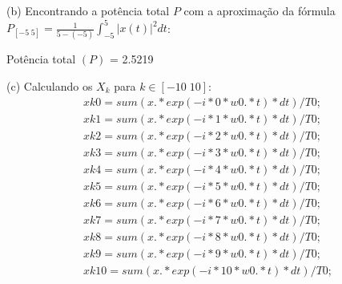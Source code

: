 \documentclass{article}
\begin{document}
\vspace{\baselineskip}

(b) Encontrando a potência total $P$ com a aproximação da fórmula $P_{[-5\;5]} = \frac{1}{5 - (-5)} \int_{-5}^{5} |x(t)|^2 dt $:

\vspace{\baselineskip}

Potência total $(P)$ = 2.5219

\vspace{\baselineskip}

(c) Calculando os $X_{k}$ para $k \in [-10\;10]$:
\begin{align*}
    xk0 = sum(x.*exp(-i*0*w0.*t)*dt)/T0;\\
    xk1 = sum(x.*exp(-i*1*w0.*t)*dt)/T0;\\
    xk2 = sum(x.*exp(-i*2*w0.*t)*dt)/T0;\\
    xk3 = sum(x.*exp(-i*3*w0.*t)*dt)/T0;\\
    xk4 = sum(x.*exp(-i*4*w0.*t)*dt)/T0;\\
    xk5 = sum(x.*exp(-i*5*w0.*t)*dt)/T0;\\
    xk6 = sum(x.*exp(-i*6*w0.*t)*dt)/T0;\\
    xk7 = sum(x.*exp(-i*7*w0.*t)*dt)/T0;\\
    xk8 = sum(x.*exp(-i*8*w0.*t)*dt)/T0;\\
    xk9 = sum(x.*exp(-i*9*w0.*t)*dt)/T0;\\
    xk10 = sum(x.*exp(-i*10*w0.*t)*dt)/T0;
\end{align*}

\vspace{\baselineskip}
\end{document}
